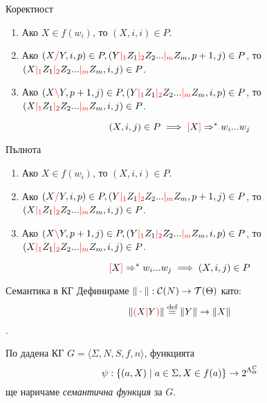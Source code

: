 \documentclass[9pt]{beamer}
\begin{document}
  \begin{frame}{Коректност}
    \begin{enumerate}
        \item Ако $X \in f(w_i)$, то $(X, i, i) \in P$.
        \item Ако $(X \textcolor{red}{/} Y, i, p) \in P, (Y \textcolor{red}{|_{1}} Z_1 \textcolor{red}{|_{2}} Z_2 ... \textcolor{red}{|_{m}} Z_m, p + 1, j) \in P$,
            то $(X \textcolor{red}{|_{1}} Z_1 \textcolor{red}{|_{2}} Z_2 ... \textcolor{red}{|_{m}} Z_m, i, j) \in P$.
        \item Ако $(X \textcolor{red}{\backslash} Y, p + 1, j) \in P, (Y \textcolor{red}{|_{1}} Z_1 \textcolor{red}{|_{2}} Z_2 ... \textcolor{red}{|_{m}} Z_m, i, p) \in P$,
            то $(X \textcolor{red}{|_{1}} Z_1 \textcolor{red}{|_{2}} Z_2 ... \textcolor{red}{|_{m}} Z_m, i, j) \in P$.
    \end{enumerate}

    \begin{equation}\label{eq:left}
        (X, i, j) \in P \implies \textcolor{red}{[} X \textcolor{red}{]} \Rightarrow^* w_i ... w_j
    \end{equation}
  \end{frame}
  \begin{frame}{Пълнота}
    \begin{enumerate}
        \item Ако $X \in f(w_i)$, то $(X, i, i) \in P$.
        \item Ако $(X \textcolor{red}{/} Y, i, p) \in P, (Y \textcolor{red}{|_{1}} Z_1 \textcolor{red}{|_{2}} Z_2 ... \textcolor{red}{|_{m}} Z_m, p + 1, j) \in P$,
            то $(X \textcolor{red}{|_{1}} Z_1 \textcolor{red}{|_{2}} Z_2 ... \textcolor{red}{|_{m}} Z_m, i, j) \in P$.
        \item Ако $(X \textcolor{red}{\backslash} Y, p + 1, j) \in P, (Y \textcolor{red}{|_{1}} Z_1 \textcolor{red}{|_{2}} Z_2 ... \textcolor{red}{|_{m}} Z_m, i, p) \in P$,
            то $(X \textcolor{red}{|_{1}} Z_1 \textcolor{red}{|_{2}} Z_2 ... \textcolor{red}{|_{m}} Z_m, i, j) \in P$.
    \end{enumerate}
    \begin{equation}\label{eq:right}
        \textcolor{red}{[} X \textcolor{red}{]} \Rightarrow^* w_i ... w_j \implies (X, i, j) \in P
    \end{equation}
  \end{frame}

  \begin{frame}{Семантика в КГ}
    Дефинираме $\|\cdot\| : \mathcal{C}( N ) \rightarrow \mathcal{T}( \Theta )$ като:
    \[\|\textcolor{red}{(} X \textcolor{red}{|} Y \textcolor{red}{)}\| \overset{\text{\scriptsize def}}{=}  \|Y\| \rightarrow \|X\|\].

    По дадена КГ $ G = \langle \Sigma, N, S, f, n \rangle $, функцията
    \[ \psi : \{ (a, X) \mid a \in \Sigma, X \in f(a) \} \rightarrow 2^{\Lambda^{C}_{\Theta}} \]
    ще наричаме \emph{семантична функция} за $G$.
  \end{frame}
\end{document}
